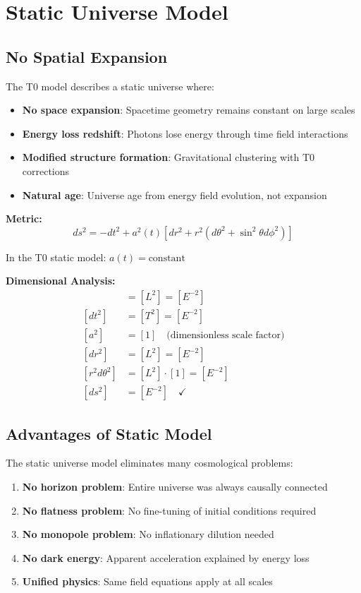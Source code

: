 \documentclass[12pt,a4paper]{report}
\begin{document}
	\section{Static Universe Model}
	\label{sec:static_universe}
	
	\subsection{No Spatial Expansion}
	\label{subsec:no_spatial_expansion}
	
	The T0 model describes a static universe where:
	\begin{itemize}
		\item \textbf{No space expansion}: Spacetime geometry remains constant on large scales
		\item \textbf{Energy loss redshift}: Photons lose energy through time field interactions
		\item \textbf{Modified structure formation}: Gravitational clustering with T0 corrections
		\item \textbf{Natural age}: Universe age from energy field evolution, not expansion
	\end{itemize}
	
	\textbf{Metric:}
	\begin{equation}
		ds^2 = -dt^2 + a^2(t)[dr^2 + r^2(d\theta^2 + \sin^2\theta d\phi^2)]
	\end{equation}
	
	In the T0 static model: $a(t) = \text{constant}$
	
	\textbf{Dimensional Analysis:}
	\begin{align}
		[ds^2] &= [L^2] = [E^{-2}] \\
		[dt^2] &= [T^2] = [E^{-2}] \\
		[a^2] &= [1] \quad \text{(dimensionless scale factor)} \\
		[dr^2] &= [L^2] = [E^{-2}] \\
		[r^2 d\theta^2] &= [L^2] \cdot [1] = [E^{-2}] \\
		[ds^2] &= [E^{-2}] \quad \checkmark
	\end{align}
	
	\subsection{Advantages of Static Model}
	\label{subsec:advantages_static}
	
	The static universe model eliminates many cosmological problems:
	\begin{enumerate}
		\item \textbf{No horizon problem}: Entire universe was always causally connected
		\item \textbf{No flatness problem}: No fine-tuning of initial conditions required
		\item \textbf{No monopole problem}: No inflationary dilution needed
		\item \textbf{No dark energy}: Apparent acceleration explained by energy loss
		\item \textbf{Unified physics}: Same field equations apply at all scales
	\end{enumerate}
	
\end{document}
